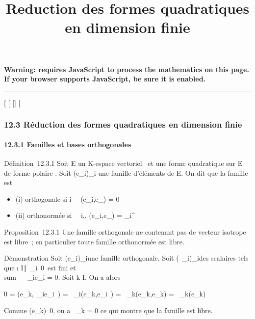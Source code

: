 \documentclass[]{article}
\title{Reduction des formes quadratiques en dimension finie}
\author{}
\date{}
\begin{document}
\maketitle

\textbf{Warning: 
requires JavaScript to process the mathematics on this page.\\ If your
browser supports JavaScript, be sure it is enabled.}

\begin{center}\rule{3in}{0.4pt}\end{center}

{[}
{[}
{[}{]}
{[}

\subsubsection{12.3 Réduction des formes quadratiques en dimension
finie}

\paragraph{12.3.1 Familles et bases orthogonales}

Définition~12.3.1 Soit E un K-espace vectoriel ~et \Phi une forme
quadratique sur E de forme polaire \phi. Soit (e\_i)\_i\inI
une famille d'éléments de E. On dit que la famille est

\begin{itemize}
\itemsep1pt\parskip0pt
\item
  (i) orthogonale si i\neq~\jmath \rigtharrow~
  \phi(e\_i,e\_\jmath) = 0
\item
  (ii) orthonormée si \forall~~i,\jmath,
  \phi(e\_i,e\_\jmath) = \delta\_i^\jmath
\end{itemize}

Proposition~12.3.1 Une famille orthogonale ne contenant pas de vecteur
isotrope est libre~; en particulier toute famille orthonormée est libre.

Démonstration Soit (e\_i)\_i\inI une famille orthogonale.
Soit (\lambda~\_i)\_i\inI des scalaires tels que
\i \in
I∣\lambda~\_i\mathrel\neq~0\
est fini et \\sum ~
\lambda~\_ie\_i = 0. Soit k \in I. On a alors

0 = \phi(e\_k,\sum \lambda~\_ie\_i~)
= \sum \lambda~\_i\phi(e\_k,e\_i~) =
\lambda~\_k\phi(e\_k,e\_k) = \lambda~\_k\Phi(e\_k)

Comme \Phi(e\_k)\neq~0, on a \lambda~\_k =
0 ce qui montre que la famille est libre.
\end{document}
